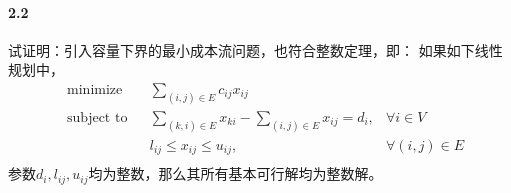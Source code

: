 \documentclass[12pt,a4paper]{article}
\begin{document}
\paragraph{2.2} 
试证明：引入容量下界的最小成本流问题，也符合整数定理，即：
如果如下线性规划中，
\begin{equation*}
\begin{aligned}
& {\text{minimize}}
& & \sum_{(i,j) \in E} c_{ij}x_{ij} \\
& \text{subject to}
& & \sum_{(k,i) \in E} x_{ki} - \sum_{(i,j)\in E} x_{ij} =d_i,&\forall i \in V\\
& & & l_{ij} \leq x_{ij} \leq u_{ij} ,&\forall (i,j) \in E\\
\end{aligned}
\end{equation*}
参数$d_i, l_{ij}, u_{ij}$均为整数，那么其所有基本可行解均为整数解。
\end{document}
